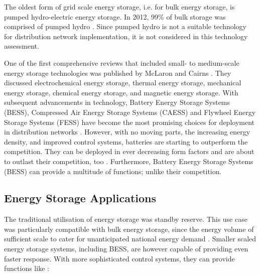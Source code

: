 The oldest form of grid scale energy storage, i.e. for bulk energy storage, is pumped hydro-electric energy storage.
In 2012, 99\% of bulk storage was comprised of pumped hydro \cite{TheEconomist2012a}.
Since pumped hydro is not a suitable technology for distribution network implementation, it is not considered in this technology assessment.

One of the first comprehensive reviews that included small- to medium-scale energy storage technologies was published by McLaron and Cairns \cite{McLarnon1989}.
They discussed electrochemical energy storage,
thermal energy storage,
mechanical energy storage,
chemical energy storage,
and magnetic energy storage.
With subsequent advancements in technology, Battery Energy Storage Systems (BESS), Compressed Air Energy Storage Systems (CAESS) and Flywheel Energy Storage Systems (FESS) have become the most promising choices for deployment in distribution networks \cite{Ibrahim2008, Chen2009, Hadjipaschalis2009}.
However, with no moving parts, the increasing energy density, and improved control systems, batteries are starting to outperform the competition.
They can be deployed in ever decreasing form factors and are about to outlast their competition, too \cite{Luo2015}.
Furthermore, Battery Energy Storage Systems (BESS) can provide a multitude of functions; unlike their competition.

\subsection{Energy Storage Applications}

The traditional utilisation of energy storage was standby reserve.
This use case was particularly compatible with bulk energy storage, since the energy volume of sufficient scale to cater for unanticipated national energy demand \cite{Guney2017}.
Smaller scaled energy storage systems, including BESS, are however capable of providing even faster response.
With more sophisticated control systems, they can provide functions like \cite{Katsanevakis2017}:

